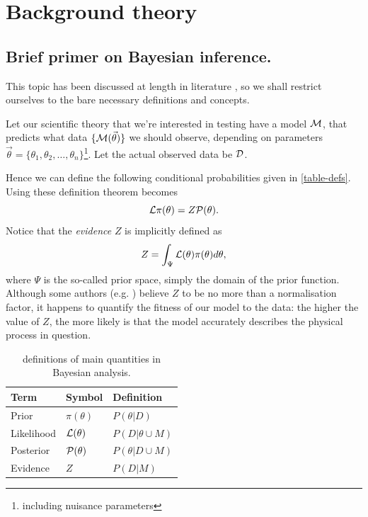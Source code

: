 \documentclass[usenatbib]{mnras}
\begin{document}
\section{Background theory}
\label{sec:org199d924}

\subsection{Brief primer on Bayesian inference.}
\label{sec:orgc105489}

This topic has been discussed at length in literature \citep{jeffreys2010scientific}, so we shall restrict ourselves to the bare necessary definitions and concepts. 

Let our scientific theory that we're interested in testing have a model \({\cal M}\), that predicts what data \(\lbrace {\cal M}(\vec{\theta})\rbrace\) we should observe, depending on parameters \(\vec{\theta} = \lbrace  \theta_1, \theta_2, \ldots, \theta_n \rbrace\)\footnote{including nuisance parameters}. Let the actual observed data be \({\cal D}\). 

   Hence we can define the following conditional probabilities given
in \autoref{table-defs}. Using these definition \citeauthor{1763} theorem
becomes 
\begin{equation}
{\cal L} \pi (\theta) = Z {\cal P} (\theta).
\label{eq:bayes} 
\end{equation}
Notice that the \emph{evidence} \(Z\) is
implicitly defined as 
\begin{equation} 
Z = \int_{\Psi} {\cal L}(\theta) \pi(\theta) d\theta, \label{eq:def-z}
\end{equation}
where \(\Psi\) is the so-called prior space, simply the domain of the
prior function. Although some authors
(e.g. \citeauthor{jeffreys2010scientific}) believe \(Z\) to be no more
than a normalisation factor, it happens to quantify the fitness of our
model to the data: the higher the value of \(Z\), the more likely is
that the model accurately describes the physical process in question.

\begin{table}[htbp]
\caption{definitions of main quantities in Bayesian analysis. \label{table-defs}}
\centering
\begin{tabular}{lll}
\textbf{\textbf{Term}} & \textbf{\textbf{Symbol}} & \textbf{\textbf{Definition}}\\
\hline
Prior & \(\pi(\theta)\) & \(P ( \theta  \vert D)\)\\
Likelihood & \({\cal L}(\theta)\) & \(P ( D \vert \theta \cup M)\)\\
Posterior & \({\cal P}(\theta)\) & \(P ( \theta \vert D \cup M)\)\\
Evidence & \(Z\) & \(P ( D \vert M)\)\\
\end{tabular}
\end{table}
\end{document}

